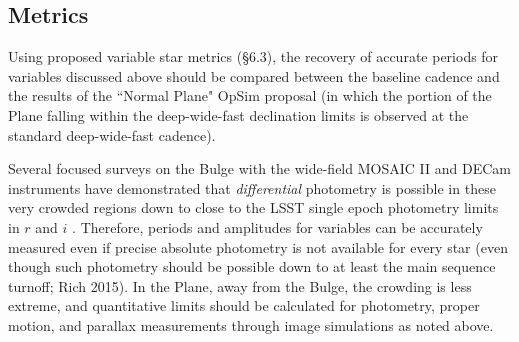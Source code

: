 




%
 \subsection{Metrics}
 \label{sec:\secname:metrics}
%

Using proposed variable star metrics (\S 6.3), the recovery of accurate periods for variables discussed above should be compared between the baseline cadence and the
results of the ``Normal Plane" OpSim proposal (in which the portion of the Plane falling within the deep-wide-fast declination limits is observed at the
standard deep-wide-fast cadence).

Several focused surveys on the Bulge with the wide-field MOSAIC II and DECam instruments have demonstrated that \emph{differential} photometry is possible in
these very crowded regions down to close to the LSST single epoch photometry
limits in $r$ and $i$ \citep[e.g.,][]{2014ApJS..214...10B}.
Therefore, periods and amplitudes for variables can be accurately measured even
if precise absolute photometry is not available for every star (even though
such photometry should be possible down to at least the main sequence turnoff;
Rich 2015). In the Plane, away from the Bulge, the crowding is less extreme,
and quantitative limits should be calculated for photometry, proper motion, and
parallax measurements through image simulations as noted above.

%
%




%
%
%

\navigationbar
